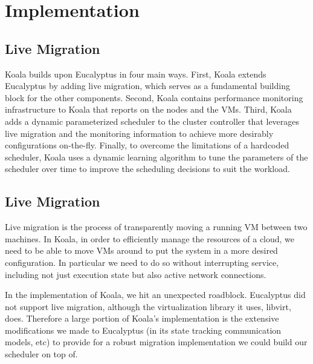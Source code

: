 \section{Implementation}
\label{sec:impl}

\subsection{Live Migration}

Koala builds upon Eucalyptus in four main ways.  First, Koala extends
Eucalyptus by adding live migration, which serves as a fundamental building
block for the other components.  Second, Koala contains performance monitoring
infrastructure to Koala that reports on the nodes and the VMs. Third,
Koala adds a dynamic parameterized scheduler to the cluster controller that
leverages live migration and the monitoring information to achieve more
desirably configurations on-the-fly.  Finally, to overcome the limitations of a
hardcoded scheduler, Koala uses a dynamic learning algorithm to tune the
parameters of the scheduler over time to improve the scheduling decisions to
suit the workload.


\subsection{Live Migration}
Live migration is the process of transparently moving a running VM between two
machines.  In Koala, in order to efficiently manage the resources of a cloud,
we need to be able to move VMs around to put the system in a more desired
configuration. In particular we need to do so without interrupting service,
including not just execution state but also active network connections.

In the implementation of Koala, we hit an unexpected roadblock.  Eucalyptus did
not support live migration, although the virtualization library it uses,
libvirt, does.  Therefore a large portion of Koala's implementation is the
extensive modifications we made to Eucalyptus (in its state tracking
communication models, etc) to provide for a robust migration implementation we
could build our scheduler on top of.

